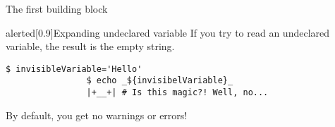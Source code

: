 \begin{frame}[fragile]{The first building block}
\begin{overlayarea}{\textwidth}{0.3\textheight}
\begin{varblock}{alerted}[0.9\textwidth]{Expanding undeclared variable}
            If you try to read an undeclared variable, the result is the empty string.\\
            \begin{lstlisting}[style=MyBash, numbers=none, belowskip=-5mm, xleftmargin=20mm, xrightmargin=20mm]
                $ invisibleVariable='Hello'
                $ echo _${invisibelVariable}_
                |+__+| # Is this magic?! Well, no...
            \end{lstlisting}
            \alert{By default, you get no warnings or errors!}
        \end{varblock}
    \end{overlayarea}
\end{frame}
